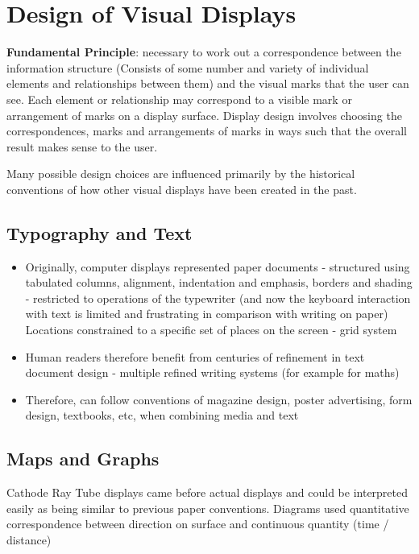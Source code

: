 \documentclass{article}
\begin{document}
\section{Design of Visual Displays}
\textbf{Fundamental Principle}: necessary to work out a correspondence between the information structure (Consists of some number and variety of individual elements and relationships between them) and the visual marks that the user can see. Each element or relationship may correspond to a visible mark or arrangement of marks on a display surface. Display design involves choosing the correspondences, marks and arrangements of marks in ways such that the overall result makes sense to the user.

\bigskip
Many possible design choices are influenced primarily by the historical conventions of how other visual displays have been created in the past. 

\subsection{Typography and Text}
\begin{itemize}
    \item Originally, computer displays represented paper documents - structured using tabulated columns, alignment, indentation and emphasis, borders and shading - restricted to operations of the typewriter (and now the keyboard interaction with text is limited and frustrating in comparison with writing on paper)
    \subitem Locations constrained to a specific set of places on the screen - grid system
    
    \item Human readers therefore benefit from centuries of refinement in text document design - multiple refined writing systems (for example for maths)
    
    \item Therefore, can follow conventions of magazine design, poster advertising, form design, textbooks, etc, when combining media and text
\end{itemize}

\subsection{Maps and Graphs}
Cathode Ray Tube displays came before actual displays and could be interpreted easily as being similar to previous paper conventions. Diagrams used quantitative correspondence between direction on surface and continuous quantity (time / distance)
\end{document}
